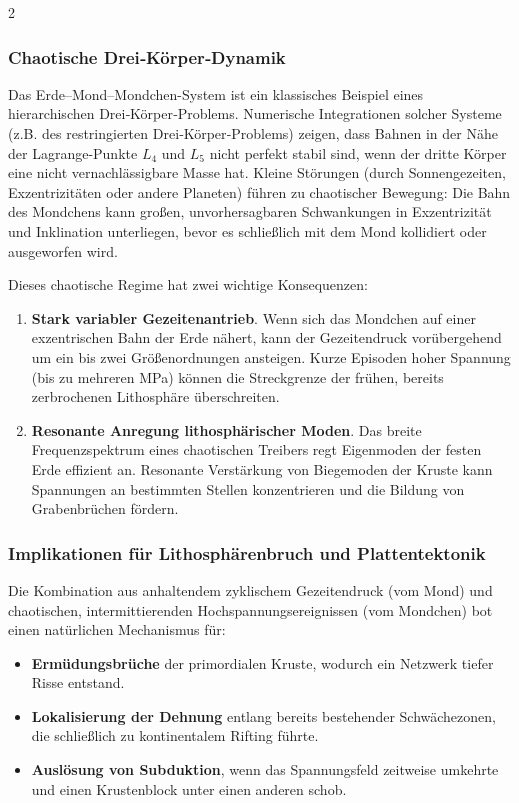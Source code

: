 \documentclass[11pt,a4paper]{article}
\begin{document}
\begin{multicols}{2}
		\subsubsection{Chaotische Drei‑Körper‑Dynamik}
		
		Das Erde–Mond–Mondchen-System ist ein klassisches Beispiel eines hierarchischen Drei‑Körper‑Problems. Numerische Integrationen solcher Systeme (z.B. des restringierten Drei‑Körper‑Problems) zeigen, dass Bahnen in der Nähe der Lagrange-Punkte \(L_{4}\) und \(L_{5}\) nicht perfekt stabil sind, wenn der dritte Körper eine nicht vernachlässigbare Masse hat. Kleine Störungen (durch Sonnengezeiten, Exzentrizitäten oder andere Planeten) führen zu chaotischer Bewegung: Die Bahn des Mondchens kann großen, unvorhersagbaren Schwankungen in Exzentrizität und Inklination unterliegen, bevor es schließlich mit dem Mond kollidiert oder ausgeworfen wird.
		
		Dieses chaotische Regime hat zwei wichtige Konsequenzen:
		
		\begin{enumerate}
			\item \textbf{Stark variabler Gezeitenantrieb}. Wenn sich das Mondchen auf einer exzentrischen Bahn der Erde nähert, kann der Gezeitendruck vorübergehend um ein bis zwei Größenordnungen ansteigen. Kurze Episoden hoher Spannung (bis zu mehreren MPa) können die Streckgrenze der frühen, bereits zerbrochenen Lithosphäre überschreiten.
			\item \textbf{Resonante Anregung lithosphärischer Moden}. Das breite Frequenzspektrum eines chaotischen Treibers regt Eigenmoden der festen Erde effizient an. Resonante Verstärkung von Biegemoden der Kruste kann Spannungen an bestimmten Stellen konzentrieren und die Bildung von Grabenbrüchen fördern.
		\end{enumerate}
		
		\subsubsection{Implikationen für Lithosphärenbruch und Plattentektonik}
		
		Die Kombination aus anhaltendem zyklischem Gezeitendruck (vom Mond) und chaotischen, intermittierenden Hochspannungsereignissen (vom Mondchen) bot einen natürlichen Mechanismus für:
		
		\begin{itemize}
			\item \textbf{Ermüdungsbrüche} der primordialen Kruste, wodurch ein Netzwerk tiefer Risse entstand.
			\item \textbf{Lokalisierung der Dehnung} entlang bereits bestehender Schwächezonen, die schließlich zu kontinentalem Rifting führte.
			\item \textbf{Auslösung von Subduktion}, wenn das Spannungsfeld zeitweise umkehrte und einen Krustenblock unter einen anderen schob.
		\end{itemize}
		

\end{multicols}
\end{document}
